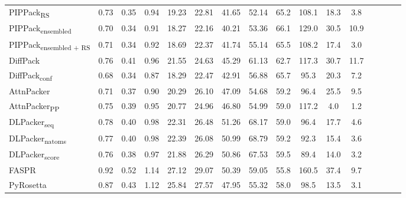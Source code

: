 \begin{table}
{\begin{tabular}{@{}lccccccccccccccc@{}}
                \textnormal{\hspace{0.5cm}PIPPack\textsubscript{RS}} & 0.73 & 0.35 & 0.94 & 19.23 & 22.81 & 41.65 & 52.14 & 65.2 & 108.1 & 18.3 & 3.8 \\
                \textnormal{\hspace{0.5cm}PIPPack\textsubscript{ensembled}} & 0.70 & 0.34 & 0.91 & 18.27 & 22.16 & 40.21 & 53.36 & 66.1 & 129.0 & 30.5 & 10.9 \\
                \textnormal{\hspace{0.5cm}PIPPack\textsubscript{ensembled + RS}} & 0.71 & 0.34 & 0.92 & 18.69 & 22.37 & 41.74 & 55.14 & 65.5 & 108.2 & 17.4 & 3.0 \\
                \textnormal{\hspace{0.5cm}DiffPack} & 0.76 & 0.41 & 0.96 & 21.55 & 24.63 & 45.29 & 61.13 & 62.7 & 117.3 & 30.7 & 11.7 \\
                \textnormal{\hspace{0.5cm}DiffPack\textsubscript{conf}} & 0.68 & 0.34 & 0.87 & 18.29 & 22.47 & 42.91 & 56.88 & 65.7 & 95.3 & 20.3 & 7.2 \\
                \textnormal{\hspace{0.5cm}AttnPacker} & 0.71 & 0.37 & 0.90 & 20.29 & 26.10 & 47.09 & 54.68 & 59.2 & 96.4 & 25.5 & 9.5 \\
                \textnormal{\hspace{0.5cm}AttnPacker\textsubscript{PP}} & 0.75 & 0.39 & 0.95 & 20.77 & 24.96 & 46.80 & 54.99 & 59.0 & 117.2 & 4.0 & 1.2 \\
                \textnormal{\hspace{0.5cm}DLPacker\textsubscript{seq}} & 0.78 & 0.40 & 0.98 & 22.31 & 26.48 & 51.26 & 68.17 & 59.0 & 96.4 & 17.7 & 4.6 \\
                \textnormal{\hspace{0.5cm}DLPacker\textsubscript{natoms}} & 0.77 & 0.40 & 0.98 & 22.39 & 26.08 & 50.99 & 68.79 & 59.2 & 92.3 & 15.4 & 3.6 \\
                \textnormal{\hspace{0.5cm}DLPacker\textsubscript{score}} & 0.76 & 0.38 & 0.97 & 21.88 & 26.29 & 50.86 & 67.53 & 59.5 & 89.4 & 14.0 & 3.2 \\
                \textnormal{\hspace{0.5cm}FASPR} & 0.92 & 0.52 & 1.14 & 27.12 & 29.07 & 50.39 & 59.05 & 55.8 & 160.5 & 37.4 & 9.7 \\
                \textnormal{\hspace{0.5cm}PyRosetta} & 0.87 & 0.43 & 1.12 & 25.84 & 27.57 & 47.95 & 55.32 & 58.0 & 98.5 & 13.5 & 3.1 \\

\end{tabular}}
\end{table}

